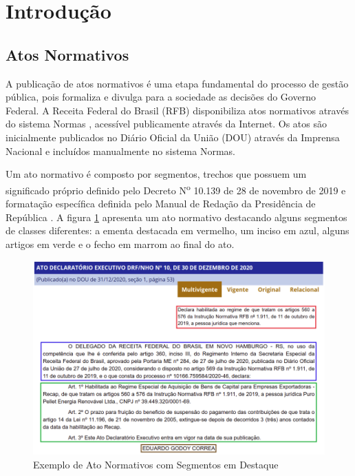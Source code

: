 \section{Introdução}

\subsection{Atos Normativos}

A publicação de atos normativos é uma etapa fundamental do processo de gestão pública, pois formaliza e divulga para a sociedade as decisões do Governo Federal. A Receita Federal do Brasil (RFB) disponibiliza atos normativos através do sistema Normas \cite{Normas2021}, acessível publicamente através da Internet. Os atos são inicialmente publicados no Diário Oficial da União (DOU) através da Imprensa Nacional \cite{ImprensaNacional2021} e incluídos manualmente no sistema Normas.

Um ato normativo é composto por segmentos, trechos que possuem um significado próprio definido pelo Decreto N\textsuperscript{o} 10.139 de 28 de novembro de 2019 \cite{Decreto10139} e formatação específica definida pelo Manual de Redação da Presidência de República \cite{ManualRedacao2018}. A figura \ref{fig:segmentos} apresenta um ato normativo destacando alguns segmentos de classes diferentes: a ementa destacada em vermelho, um inciso em azul, alguns artigos em verde e o fecho em marrom ao final do ato. 

\begin{figure}[h]
	\caption{Exemplo de Ato Normativos com Segmentos em Destaque}
	\center
	\label{fig:segmentos}
	\includegraphics[scale=1.9]{introducao/segmentos.png}
\end{figure}

